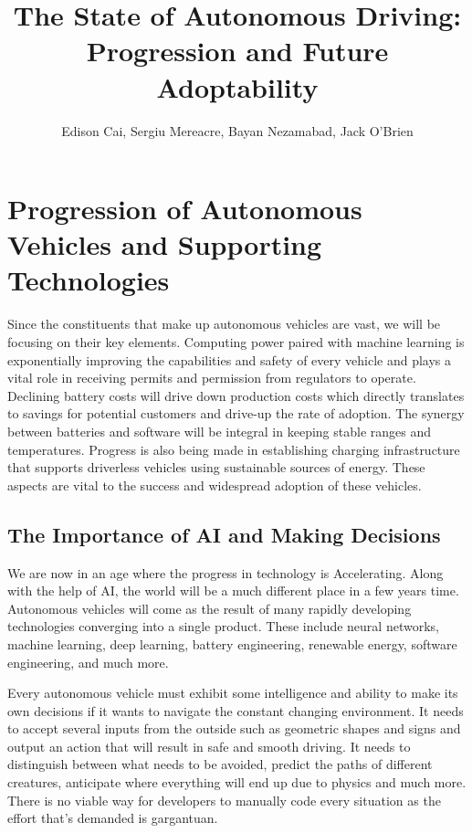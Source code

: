 \documentclass{article}
\author{Edison Cai, Sergiu Mereacre, Bayan Nezamabad, Jack O'Brien}
\title{The State of Autonomous Driving: Progression and Future Adoptability}
\begin{document}
\maketitle

\section{Progression of Autonomous Vehicles and Supporting Technologies}

Since the constituents that make up autonomous vehicles are vast, we will be focusing on their key elements. Computing power paired with machine learning is exponentially improving the capabilities and safety of every vehicle and plays a vital role in receiving permits and permission from regulators to operate. Declining battery costs will drive down production costs which directly translates to savings for potential customers and drive-up the rate of adoption. The synergy between batteries and software will be integral in keeping stable ranges and temperatures. Progress is also being made in establishing charging infrastructure that supports driverless vehicles using sustainable sources of energy. These aspects are vital to the success and widespread adoption of these vehicles.  

\subsection{The Importance of AI and Making Decisions}

We are now in an age where the progress in technology is Accelerating. Along with the help of AI, the world will be a much different place in a few years time. Autonomous vehicles will come as the result of many rapidly developing technologies converging into a single product. These include neural networks, machine learning, deep learning, battery engineering, renewable energy, software engineering, and much more. 

Every autonomous vehicle must exhibit some intelligence and ability to make its own decisions if it wants to navigate the constant changing environment. It needs to accept several inputs from the outside such as geometric shapes and signs and output an action that will result in safe and smooth driving. It needs to distinguish between what needs to be avoided, predict the paths of different creatures, anticipate where everything will end up due to physics and much more. There is no viable way for developers to manually code every situation as the effort that’s demanded is gargantuan.  
\end{document}
